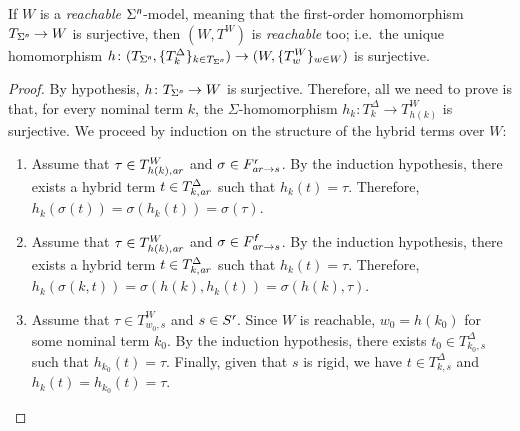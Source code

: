 \documentclass[a4paper,UKenglish,cleveref,autoref]{lipics-v2019}
\begin{document}
\begin{proposition} 
  \label{proposition:tm-reachability}
  If\/ \(W\) is a \emph{reachable} \(\Sigma^{\text{\normalfont\sffamily\itshape n}}\)-model, meaning that the first-order homomorphism \(T_{\Sigma^{\text{\normalfont\sffamily\itshape n}}} \to W\) is surjective, then \((W, T^{W})\) is \emph{reachable} too; i.e.\ the unique homomorphism \(h \colon (T_{\Sigma^{\text{\normalfont\sffamily\itshape n}}}, \{ T^{\Delta}_{k} \}_{k \in T_{\Sigma^{\text{\normalfont\sffamily\itshape n}}}}) \to (W, \{ T^{W}_{w} \}_{w \in W})\) is surjective.
\end{proposition}
\begin{proof}
  By hypothesis, \(h \colon T_{\Sigma^{\text{\normalfont\sffamily\itshape n}}} \to W\) is surjective.
  Therefore, all we need to prove is that, for every nominal term \(k\), the \(\Sigma\)-homomorphism \(h_{k} \colon T^{\Delta}_{k} \to T^{W}_{h(k)}\) is surjective.
  We proceed by induction on the structure of the hybrid terms over \(W\):
  \begin{enumerate}
  \item Assume that \(\tau \in T^{W}_{h(k),\mathit{a\mkern -1mu r}}\) and \(\sigma \in F^{\text{\normalfont\sffamily\itshape r}}_{\mathit{a\mkern -1mu r} \to s}\).
    By the induction hypothesis, there exists a hybrid term \(t \in T^{\Delta}_{k,\mathit{a\mkern -1mu r}}\) such that \(h_{k}(t) = \tau\).
    Therefore, \(h_{k}(\sigma(t)) = \sigma(h_{k}(t)) = \sigma(\tau)\).

  \item Assume that \(\tau \in T^{W}_{h(k),\mathit{a\mkern -1mu r}}\) and \(\sigma \in F^{\text{\normalfont\sffamily\itshape f}}_{\mathit{a\mkern -1mu r} \to s}\).
    By the induction hypothesis, there exists a hybrid term \(t \in T^{\Delta}_{k,\mathit{a\mkern -1mu r}}\) such that \(h_{k}(t) = \tau\).
    Therefore, \(h_{k}(\sigma(k, t)) = \sigma(h(k), h_{k}(t)) = \sigma(h(k), \tau)\).

  \item Assume that \(\tau \in T^{W}_{w_{0}, s}\) and \(s \in S^{\text{\normalfont\sffamily\itshape r}}\).
    Since \(W\) is reachable, \(w_{0} = h(k_{0})\) for some nominal term \(k_{0}\).
    By the induction hypothesis, there exists \(t_{0} \in T^{\Delta}_{k_{0}, s}\) such that \(h_{k_{0}}(t) = \tau\).
    Finally, given that \(s\) is rigid, we have \(t \in T^{\Delta}_{k, s}\) and \(h_{k}(t) = h_{k_{0}}(t) = \tau\).
    \qedhere
  \end{enumerate}
\end{proof}
\end{document}
